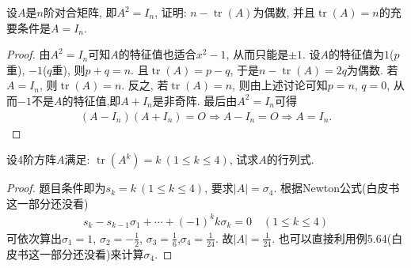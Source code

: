 \documentclass[../../main.tex]{subfiles}
\begin{document}
\begin{example}
设$A$是$n$阶对合矩阵, 即$A^2 = I_n$, 证明: $n - \operatorname{tr}(A)$为偶数, 并且$\operatorname{tr}(A) = n$的充要条件是$A = I_n$.
\end{example}
\begin{proof}
由$A^2 = I_n$可知$A$的特征值也适合$x^2 - 1$, 从而只能是$\pm 1$. 设$A$的特征值为$1$($p$重), $-1$($q$重), 则$p + q = n$. 且$\operatorname{tr}(A) = p - q$, 于是$n - \operatorname{tr}(A) = 2q$为偶数. 若$A = I_n$, 则$\operatorname{tr}(A) = n$. 反之, 若$\operatorname{tr}(A) = n$, 则由上述讨论可知$p = n$, $q = 0$, 从而$-1$不是$A$的特征值,即$A + I_n$是非奇阵. 最后由$A^2=I_n$可得
\begin{align*}
(A - I_n)(A + I_n) = O\Rightarrow A-I_n=O\Rightarrow A = I_n.
\end{align*}
\end{proof}

\begin{example}
设4阶方阵$A$满足: $\operatorname{tr}(A^k) = k \ (1 \leq k \leq 4)$, 试求$A$的行列式.
\end{example}
\begin{proof}
题目条件即为$s_k = k \ (1 \leq k \leq 4)$, 要求$\lvert A \rvert = \sigma_4$. 根据Newton公式(白皮书这一部分还没看)
\begin{align*}
s_k - s_{k-1} \sigma_1 + \cdots + (-1)^k k \sigma_k = 0 \quad (1 \leq k \leq 4)
\end{align*}
可依次算出$\sigma_1 = 1$, $\sigma_2 = -\frac{1}{2}$, $\sigma_3 = \frac{1}{6}$,$\sigma_4 = \frac{1}{24}.$
故$\lvert A \rvert = \frac{1}{24}$. 也可以直接利用例5.64(白皮书这一部分还没看)来计算$\sigma_4$.
\end{proof}
\end{document}
